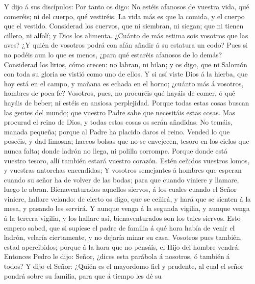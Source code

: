 Y dijo á sus discípulos: Por tanto os digo: No estéis afanosos de
vuestra vida, qué comeréis; ni del cuerpo, qué vestiréis.
 La vida más es que la comida, y el cuerpo que el
vestido.  Considerad los cuervos, que ni siembran, ni
siegan; que ni tienen cillero, ni alfolí; y Dios los alimenta. ¿Cuánto
de más estima sois vosotros que las aves?  ¿Y quién de
vosotros podrá con afán añadir á su estatura un codo? 
Pues si no podéis aun lo que es menos, ¿para qué estaréis afanosos de lo
demás?  Considerad los lirios, cómo crecen: no labran, ni
hilan; y os digo, que ni Salomón con toda su gloria se vistió como uno
de ellos.  Y si así viste Dios á la hierba, que hoy está
en el campo, y mañana es echada en el horno; ¿cuánto más á vosotros,
hombres de poca fe?  Vosotros, pues, no procuréis qué
hayáis de comer, ó qué hayáis de beber; ni estéis en ansiosa
perplejidad.  Porque todas estas cosas buscan las gentes
del mundo; que vuestro Padre sabe que necesitáis estas cosas.
 Mas procurad el reino de Dios, y todas estas cosas os
serán añadidas.  No temáis, manada pequeña; porque al
Padre ha placido daros el reino.  Vended lo que poseéis,
y dad limosna; haceos bolsas que no se envejecen, tesoro en los cielos
que nunca falta; donde ladrón no llega, ni polilla corrompe.
 Porque donde está vuestro tesoro, allí también estará
vuestro corazón.  Estén ceñidos vuestros lomos, y
vuestras antorchas encendidas;  Y vosotros semejantes á
hombres que esperan cuando su señor ha de volver de las bodas; para que
cuando viniere y llamare, luego le abran. 
Bienaventurados aquellos siervos, á los cuales cuando el Señor viniere,
hallare velando: de cierto os digo, que se ceñirá, y hará que se sienten
á la mesa, y pasando les servirá.  Y aunque venga á la
segunda vigilia, y aunque venga á la tercera vigilia, y los hallare así,
bienaventurados son los tales siervos.  Esto empero
sabed, que si supiese el padre de familia á qué hora había de venir el
ladrón, velaría ciertamente, y no dejaría minar su casa. 
Vosotros pues también, estad apercibidos; porque á la hora que no
pensáis, el Hijo del hombre vendrá.  Entonces Pedro le
dijo: Señor, ¿dices esta parábola á nosotros, ó también á todos?
 Y dijo el Señor: ¿Quién es el mayordomo fiel y prudente,
al cual el señor pondrá sobre su familia, para que á tiempo les dé su
